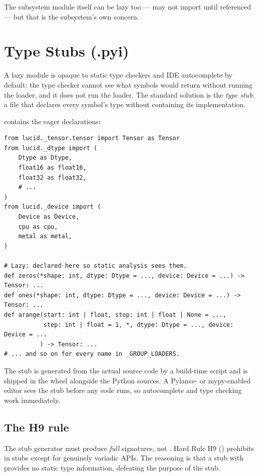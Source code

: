 The subsystem module itself can be lazy too --- 
may not import  until referenced --- but
that is the subsystem's own concern.

\section{Type Stubs (.pyi)}
\label{sec:lazy_imports:stubs}

A lazy module is opaque to static type checkers and IDE
autocomplete by default: the type checker cannot see what symbols
 would return without running the
loader, and it does not run the loader. The standard solution is
the \emph{type stub}: a  file that declares every
symbol's type without containing its implementation.

 contains the eager declarations:

\begin{lstlisting}[style=lucid,language=LucidPython]
from lucid._tensor.tensor import Tensor as Tensor
from lucid._dtype import (
    Dtype as Dtype,
    float16 as float16,
    float32 as float32,
    # ...
)
from lucid._device import (
    Device as Device,
    cpu as cpu,
    metal as metal,
)

# Lazy: declared here so static analysis sees them.
def zeros(*shape: int, dtype: Dtype = ..., device: Device = ...) -> Tensor: ...
def ones(*shape: int, dtype: Dtype = ..., device: Device = ...) -> Tensor: ...
def arange(start: int | float, stop: int | float | None = ...,
           step: int | float = 1, *, dtype: Dtype = ..., device: Device = ...
          ) -> Tensor: ...
# ... and so on for every name in _GROUP_LOADERS.
\end{lstlisting}

The stub is generated from the actual source code by a build-time
script and is shipped in the wheel alongside the Python sources. A
Pylance- or mypy-enabled editor sees the stub before any
 code runs, so autocomplete and type checking work
immediately.

\subsection{The H9 rule}
\label{ssec:lazy_imports:h9}

The stub generator must produce \emph{full} signatures, not
. Hard Rule H9 ()
prohibits  in stubs except for genuinely
variadic APIs. The reasoning is that a stub with  provides no static type information, defeating the
purpose of the stub.

